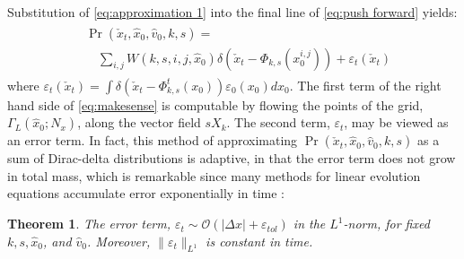 \documentclass[letterpaper,10pt,conference]{ieeetran}
\newtheorem{thm}{Theorem}
\begin{document}
Substitution of \eqref{eq:approximation 1} into the final line of \eqref{eq:push forward} yields:
\begin{align}
	\begin{split}
	&\Pr( \check{x}_t , \hat{x}_0, \hat{v}_0, k,s) = \\
	&\quad \sum_{i,j} W(k,s,i,j,\hat{x}_0) \delta \left( \check{x}_t - \Phi_{k,s}( x_0^{i,j}) \right) + \varepsilon_t( \check{x}_t)
	\end{split}
	\label{eq:makesense}
\end{align}
where $\varepsilon_t( \check{x}_t) = \int \delta\left( \check{x}_t - \Phi_{k,s}^{t}( x_0) \right)  \varepsilon_0(x_0) dx_0$.
The first term of the right hand side of \eqref{eq:makesense} is computable by flowing the points of the grid, $\Gamma_L(\hat{x}_0; N_x)$, along the vector field $s X_k$.
The second term, $\varepsilon_t$, may be viewed as an error term.
In fact, this method of approximating $\Pr( \check{x}_t , \hat{x}_0, \hat{v}_0, k,s)$ as a sum of Dirac-delta distributions is adaptive, in that the error term does not grow in total mass, which is remarkable since many methods for linear evolution equations accumulate error exponentially in time \cite{Leveque1992,Gottlieb2001}:

\begin{thm} \label{thm:error}
	The error term, $\varepsilon_t \sim \mathcal{O}( | \Delta x | + \varepsilon_{tol} )$ in the $L^1$-norm, for fixed $k,s,\hat{x}_0$, and $\hat{v}_0$.
	Moreover, $\| \varepsilon_t \|_{L^1}$ is constant in time.
\end{thm}
\end{document}
